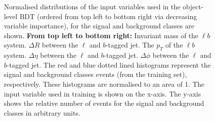 \begin{figure}[h!]
  
    \caption{Normalised distributions of the input variables used in the object-level BDT (ordered from top left to bottom right via decreasing variable importance), for the signal and background classes are shown. \textbf{From top left to bottom right:} Invariant mass of the $\ell b$ system. $\Delta R$ between the $\ell$ and $b$-tagged jet. The $p_{T}$ of the $\ell b$ system. $\Delta \eta$ between the $\ell$ and $b$-tagged jet. $\Delta \phi$ between the $\ell$ and $b$-tagged jet. The red and blue dotted lined histograms represent the signal and background classes events (from the training set), respectively. These histograms are normalised to an area of 1. The input variable used in training is shown on the x-axis. The y-axis shows the relative number of events for the signal and background classes in arbitrary units. }
    \label{fig:norm-object-bdt-vars}
\end{figure}


